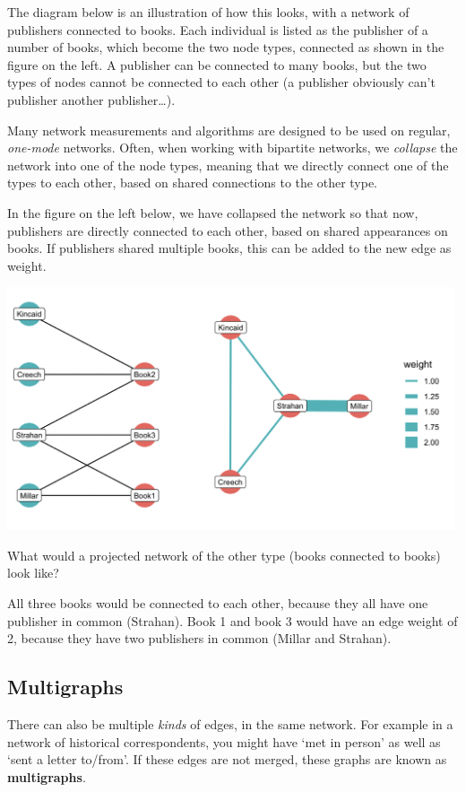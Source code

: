 \documentclass[
]{book}
\begin{document}
The diagram below is an illustration of how this looks, with a network of publishers connected to books. Each individual is listed as the publisher of a number of books, which become the two node types, connected as shown in the figure on the left. A publisher can be connected to many books, but the two types of nodes cannot be connected to each other (a publisher obviously can't publisher another publisher\ldots).

Many network measurements and algorithms are designed to be used on regular, \emph{one-mode} networks. Often, when working with bipartite networks, we \emph{collapse} the network into one of the node types, meaning that we directly connect one of the types to each other, based on shared connections to the other type.

In the figure on the left below, we have collapsed the network so that now, publishers are directly connected to each other, based on shared appearances on books. If publishers shared multiple books, this can be added to the new edge as weight.

\includegraphics[width=5.20833in,height=\textheight]{images/bipartite.png}

What would a projected network of the other type (books connected to books) look like?

All three books would be connected to each other, because they all have one publisher in common (Strahan). Book 1 and book 3 would have an edge weight of 2, because they have two publishers in common (Millar and Strahan).

\hypertarget{multigraphs}{%
\subsection{Multigraphs}\label{multigraphs}}

There can also be multiple \emph{kinds} of edges, in the same network. For example in a network of historical correspondents, you might have `met in person' as well as `sent a letter to/from'. If these edges are not merged, these graphs are known as \textbf{multigraphs}.
\end{document}
